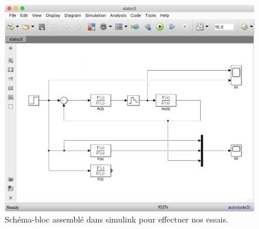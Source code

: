 \begin{figure}[!ht]
    \centering
    \includegraphics[width=\textwidth]{images/slabo3.png}
    \caption{Schéma-bloc assemblé dans simulink pour effectuer nos essais.}
    \label{fig:slabo3}
\end{figure}
